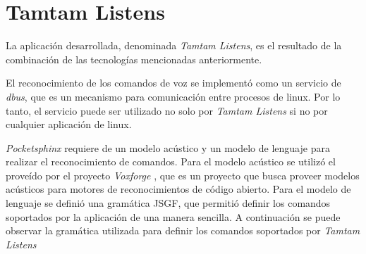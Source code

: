 \section{Tamtam Listens}
\label{sec:tamtam-listens}

La aplicación desarrollada, denominada \emph{Tamtam Listens}, es el resultado de la combinación
de las tecnolog\'ias mencionadas anteriormente.

El reconocimiento de los comandos de voz se implement\'o como un servicio de \emph{dbus}\cite{Dbus2013}, que es
un mecanismo para comunicaci\'on entre procesos de linux. Por lo tanto, el servicio puede ser utilizado
no solo por \emph{Tamtam Listens} si no por cualquier aplicaci\'on de linux. 

\emph{Pocketsphinx} requiere de un modelo ac\'ustico y un modelo de lenguaje para realizar
el reconocimiento de comandos. Para el modelo ac\'ustico se utiliz\'o el prove\'ido por el proyecto \emph{Voxforge}
\cite{Voxforge}, que es un proyecto que busca proveer modelos ac\'usticos para motores de reconocimientos
de c\'odigo abierto. Para el modelo de lenguaje se defini\'o una gram\'atica JSGF\cite{JSGF2000}, que permiti\'o definir los
comandos soportados por la aplicaci\'on de una manera sencilla. A continuaci\'on se puede observar la gram\'atica utilizada
para definir los comandos soportados por \emph{Tamtam Listens} 


\lstset{
  basicstyle=\scriptsize,        %
  breakatwhitespace=false,         %
  frame=single,                    %
  language=Octave,                 %
  numbersep=5pt,                   %
  showstringspaces=false,          %
  stepnumber=2,                    %
  tabsize=2                       %
}


